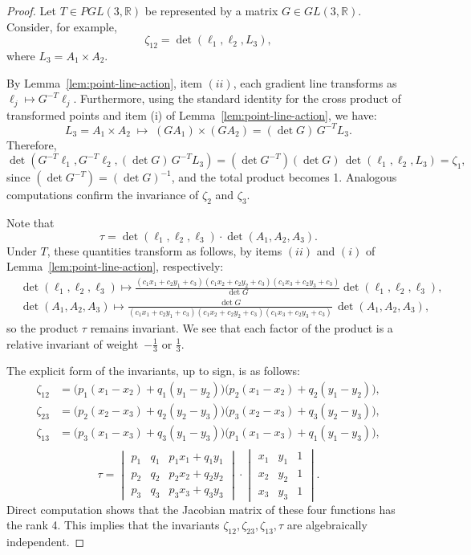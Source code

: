 \documentclass[12pt,reqno]{amsart}
\begin{document}
\begin{proof}
Let \(T \in PGL(3,\mathbb{R})\) be represented by a matrix \(G \in GL(3,\mathbb{R})\).  Consider, for example,
\[
\zeta_{12} = \det(\ell_1, \ell_2, L_3),
\]
where \(L_3 = A_1 \times A_2\). 

By Lemma~\ref{lem:point-line-action}, item $(ii)$, each gradient line transforms as \(\ell_j \mapsto G^{-T} \ell_j\). 
Furthermore, using the standard identity for the cross product of transformed points and item (i) of Lemma~\ref{lem:point-line-action}, we have:
\[
L_3 = A_1 \times A_2 \;\mapsto\; (G A_1) \times (G A_2) = (\det G)\, G^{-T} L_3.
\]
Therefore,
\[
\det(G^{-T}\ell_1, G^{-T}\ell_2, (\det G)\,G^{-T}L_3)
= (\det G^{-T}) (\det G)\, \det(\ell_1, \ell_2, L_3)
= \zeta_1,
\]
since \((\det G^{-T}) = (\det G)^{-1}\), and the total product becomes 1. Analogous computations confirm the invariance of \(\zeta_2\) and \(\zeta_3\).

 Note that
\[
\tau = \det(\ell_1, \ell_2, \ell_3) \cdot \det(A_1, A_2, A_3).
\]
Under \(T\), these quantities transform as follows, by items $(ii)$ and $(i)$ of Lemma~\ref{lem:point-line-action}, respectively:
\begin{align*}
&\det(\ell_1, \ell_2, \ell_3) \mapsto \frac{(c_1 x_1+c_2 y_1 +c_3)(c_1 x_2+c_2 y_2 +c_3)(c_1 x_3+c_2 y_3 +c_3)}{\det G} \det(\ell_1, \ell_2, \ell_3),\\
&\det(A_1, A_2, A_3) \mapsto \frac{\det G}{(c_1 x_1+c_2 y_1 +c_3)(c_1 x_2+c_2 y_2 +c_3)(c_1 x_3+c_2 y_3 +c_3)}\, \det(A_1, A_2, A_3),
\end{align*}
so the product \(\tau\) remains invariant.  We see  that each factor of the product
is a relative invariant of weight~\(-\tfrac{1}{3}\)  or \(\tfrac{1}{3}\).

 The explicit form of the invariants,  up to sign,  is as follows:
\[
\begin{aligned}
\zeta_{12} &=
 \bigl(p_1(x_1-x_2)+q_1(y_1-y_2)\bigr)
 \bigl(p_2(x_1-x_2)+q_2(y_1-y_2)\bigr),\\[6pt]
\zeta_{23} &=
 \bigl(p_2(x_2-x_3)+q_2(y_2-y_3)\bigr)
 \bigl(p_3(x_2-x_3)+q_3(y_2-y_3)\bigr),\\[6pt]
\zeta_{13} &=
 \bigl(p_3(x_1-x_3)+q_3(y_1-y_3)\bigr)
 \bigl(p_1(x_1-x_3)+q_1(y_1-y_3)\bigr),\\[6pt]
\end{aligned}
\]
$$
\tau= 
\begin{vmatrix}
 p_1 & q_1 & p_1x_1+q_1y_1\\
 p_2 & q_2 & p_2x_2+q_2y_2\\
 p_3 & q_3 & p_3x_3+q_3y_3
\end{vmatrix}\cdot \begin{vmatrix}
 x_1 & y_1 & 1\\
 x_2 & y_2 & 1\\
 x_3 & y_3 & 1
\end{vmatrix}.
$$
Direct computation shows that the Jacobian matrix of these four functions  has the rank 4. This implies that the invariants $\zeta_{12}, \zeta_{23}, \zeta_{13}, \tau$ are algebraically independent. 

\end{proof}
\end{document}
